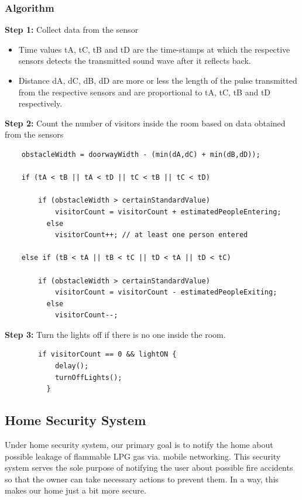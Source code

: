 \subsubsection{Algorithm}

\textbf{Step 1:} Collect data from the sensor

\begin{itemize}

  \item Time values tA, tC, tB and tD are the time-stamps at which the
    respective sensors detects the transmitted sound wave after it
    reflects back.

  \item Distance dA, dC, dB, dD are more or less the length of the
    pulse transmitted from the respective sensors and are proportional
    to tA, tC, tB and tD respectively.

\end{itemize}

\textbf{Step 2:} Count the number of visitors inside the room based on
data obtained from the sensors

\begin{verbatim}
    obstacleWidth = doorwayWidth - (min(dA,dC) + min(dB,dD));

    if (tA < tB || tA < tD || tC < tB || tC < tD)

        if (obstacleWidth > certainStandardValue)
            visitorCount = visitorCount + estimatedPeopleEntering;
          else
            visitorCount++; // at least one person entered

    else if (tB < tA || tB < tC || tD < tA || tD < tC)

        if (obstacleWidth > certainStandardValue)
            visitorCount = visitorCount - estimatedPeopleExiting;
          else
            visitorCount--;
\end{verbatim}

\textbf{Step 3:} Turn the lights off if there is no one inside the
room.
\begin{verbatim}
        if visitorCount == 0 && lightON {
            delay();
            turnOffLights();
          }
\end{verbatim}
\vfill \newpage

\subsection{Home Security System}

Under home security system, our primary goal is to notify the home
about possible leakage of flammable LPG gas via. mobile networking.
This security system serves the sole purpose of notifying the user
about possible fire accidents so that the owner can take necessary
actions to prevent them. In a way, this makes our home just a bit more
secure.


